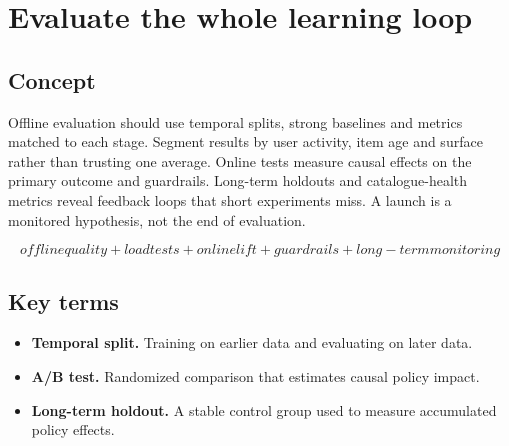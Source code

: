 \section{Evaluate the whole learning loop}

\begin{abstract}
Offline replay diagnoses models; controlled online experiments test causal product value.
\end{abstract}

\subsection{Concept}
Offline evaluation should use temporal splits, strong baselines and metrics matched to each stage. Segment results by user activity, item age and surface rather than trusting one average. Online tests measure causal effects on the primary outcome and guardrails. Long-term holdouts and catalogue-health metrics reveal feedback loops that short experiments miss. A launch is a monitored hypothesis, not the end of evaluation.

\begin{equation*}
offline quality + load tests + online lift + guardrails + long-term monitoring
\end{equation*}

\subsection{Key terms}
\begin{itemize}
\item \textbf{Temporal split.} Training on earlier data and evaluating on later data.
\item \textbf{A/B test.} Randomized comparison that estimates causal policy impact.
\item \textbf{Long-term holdout.} A stable control group used to measure accumulated policy effects.
\end{itemize}
